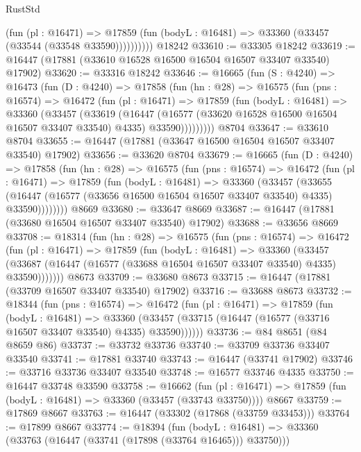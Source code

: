 \begin{lexlean}{RustStd}
\begin{coremodule}
{\begin{coremodule}
{{{{{{{{{{{{{{{{{{{{{{{{{{{{{{{{{{{{{{{{{{{{{{{{{{{{{{{              (fun (pl : @16471) =>
              @17859 (fun (bodyL : @16481) => @33360 (@33457 (@33544 (@33548 @33590))))))))))
    @18242
@33610 := @33305 @18242
@33619 := @16447 (@17881 (@33610 @16528 @16500 @16504 @16507 @33407 @33540) @17902)
@33620 := @33316 @18242
@33646 := @16665
    (fun (S : @4240) =>
    @16473
      (fun (D : @4240) =>
      @17858
        (fun (hn : @28) =>
        @16575
          (fun (pns : @16574) =>
          @16472
            (fun (pl : @16471) =>
            @17859
              (fun (bodyL : @16481) =>
              @33360
                (@33457
                  (@33619
                    (@16447
                      (@16577 (@33620 @16528 @16500 @16504 @16507 @33407 @33540) @4335)
                      @33590)))))))))
    @8704
@33647 := @33610 @8704
@33655 := @16447 (@17881 (@33647 @16500 @16504 @16507 @33407 @33540) @17902)
@33656 := @33620 @8704
@33679 := @16665
    (fun (D : @4240) =>
    @17858
      (fun (hn : @28) =>
      @16575
        (fun (pns : @16574) =>
        @16472
          (fun (pl : @16471) =>
          @17859
            (fun (bodyL : @16481) =>
            @33360
              (@33457
                (@33655
                  (@16447 (@16577 (@33656 @16500 @16504 @16507 @33407 @33540) @4335) @33590))))))))
    @8669
@33680 := @33647 @8669
@33687 := @16447 (@17881 (@33680 @16504 @16507 @33407 @33540) @17902)
@33688 := @33656 @8669
@33708 := @18314
    (fun (hn : @28) =>
    @16575
      (fun (pns : @16574) =>
      @16472
        (fun (pl : @16471) =>
        @17859
          (fun (bodyL : @16481) =>
          @33360
            (@33457
              (@33687 (@16447 (@16577 (@33688 @16504 @16507 @33407 @33540) @4335) @33590)))))))
    @8673
@33709 := @33680 @8673
@33715 := @16447 (@17881 (@33709 @16507 @33407 @33540) @17902)
@33716 := @33688 @8673
@33732 := @18344
    (fun (pns : @16574) =>
    @16472
      (fun (pl : @16471) =>
      @17859
        (fun (bodyL : @16481) =>
        @33360 (@33457 (@33715 (@16447 (@16577 (@33716 @16507 @33407 @33540) @4335) @33590))))))
@33736 := @84 @8651 (@84 @8659 @86)
@33737 := @33732 @33736
@33740 := @33709 @33736 @33407 @33540
@33741 := @17881 @33740
@33743 := @16447 (@33741 @17902)
@33746 := @33716 @33736 @33407 @33540
@33748 := @16577 @33746 @4335
@33750 := @16447 @33748 @33590
@33758 := @16662
    (fun (pl : @16471) => @17859 (fun (bodyL : @16481) => @33360 (@33457 (@33743 @33750))))
    @8667
@33759 := @17869 @8667
@33763 := @16447 (@33302 (@17868 (@33759 @33453)))
@33764 := @17899 @8667
@33774 := @18394
    (fun (bodyL : @16481) => @33360 (@33763 (@16447 (@33741 (@17898 (@33764 @16465))) @33750)))
}}}}}}}}}}}}}}}}}}}}}}}}}}}}}}}}}}}}}}}}}}}}}}}}}}}}}}}
\end{coremodule}}
\end{coremodule}
\end{lexlean}
